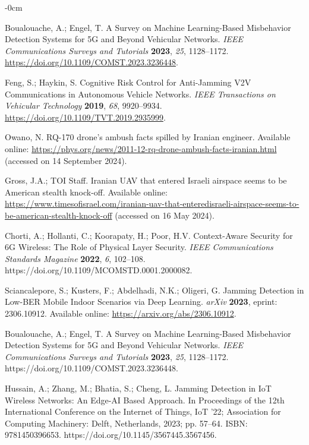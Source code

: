 \documentclass[futureinternet,article,submit,pdftex,moreauthors]{Definitions/mdpi}
\begin{document}
\begin{adjustwidth}{-\extralength}{0cm}
\begin{thebibliography}{999}
Boualouache, A.; Engel, T. A Survey on Machine Learning-Based Misbehavior Detection Systems for 5G and Beyond Vehicular Networks. {\em IEEE Communications Surveys and Tutorials} {\bf 2023}, {\em 25}, 1128--1172. \url{https://doi.org/10.1109/COMST.2023.3236448}.

Feng, S.; Haykin, S. Cognitive Risk Control for Anti-Jamming V2V Communications in Autonomous Vehicle Networks. {\em IEEE Transactions on Vehicular Technology} {\bf 2019}, {\em 68}, 9920--9934. \url{https://doi.org/10.1109/TVT.2019.2935999}.

Owano, N. RQ-170 drone's ambush facts spilled by Iranian engineer. Available online: \url{https://phys.org/news/2011-12-rq-drone-ambush-facts-iranian.html} (accessed on 14 September 2024).

Gross, J.A.; TOI Staff. Iranian UAV that entered Israeli airspace seems to be American stealth knock-off. Available online: \url{https://www.timesofisrael.com/iranian-uav-that-enteredisraeli-airspace-seems-to-be-american-stealth-knock-off} (accessed on 16 May 2024).

Chorti, A.; Hollanti, C.; Koorapaty, H.; Poor, H.V. Context-Aware Security for 6G Wireless: The Role of Physical Layer Security. {\em IEEE Communications Standards Magazine} {\bf 2022}, {\em 6}, 102--108. https://doi.org/10.1109/MCOMSTD.0001.2000082.

Sciancalepore, S.; Kusters, F.; Abdelhadi, N.K.; Oligeri, G. Jamming Detection in Low-BER Mobile Indoor Scenarios via Deep Learning. {\em arXiv} {\bf 2023}, eprint: 2306.10912. Available online: \url{https://arxiv.org/abs/2306.10912}.

Boualouache, A.; Engel, T. A Survey on Machine Learning-Based Misbehavior Detection Systems for 5G and Beyond Vehicular Networks. {\em IEEE Communications Surveys and Tutorials} {\bf 2023}, {\em 25}, 1128--1172. https://doi.org/10.1109/COMST.2023.3236448.

Hussain, A.; Zhang, M.; Bhatia, S.; Cheng, L. Jamming Detection in IoT Wireless Networks: An Edge-AI Based Approach. In Proceedings of the 12th International Conference on the Internet of Things, IoT ’22; Association for Computing Machinery: Delft, Netherlands, 2023; pp. 57--64. ISBN: 9781450396653. https://doi.org/10.1145/3567445.3567456.


\end{thebibliography}
\end{adjustwidth}
\end{document}
